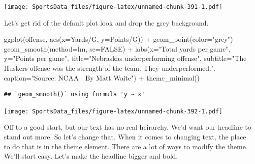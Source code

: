 \documentclass[
]{book}
\newenvironment{Shaded}{\begin{snugshade}}{\end{snugshade}}
\newcommand{\AttributeTok}[1]{\textcolor[rgb]{0.77,0.63,0.00}{#1}}
\newcommand{\ConstantTok}[1]{\textcolor[rgb]{0.00,0.00,0.00}{#1}}
\newcommand{\FunctionTok}[1]{\textcolor[rgb]{0.00,0.00,0.00}{#1}}
\newcommand{\NormalTok}[1]{#1}
\newcommand{\SpecialCharTok}[1]{\textcolor[rgb]{0.00,0.00,0.00}{#1}}
\newcommand{\StringTok}[1]{\textcolor[rgb]{0.31,0.60,0.02}{#1}}
\begin{document}
\texttt{[image: SportsData\_files/figure-latex/unnamed-chunk-391-1.pdf]}

Let's get rid of the default plot look and drop the grey background.

\begin{Shaded}
\begin{Highlighting}[]
\FunctionTok{ggplot}\NormalTok{(offense, }\FunctionTok{aes}\NormalTok{(}\AttributeTok{x=}\StringTok{\textasciigrave{}}\AttributeTok{Yards/G}\StringTok{\textasciigrave{}}\NormalTok{, }\AttributeTok{y=}\StringTok{\textasciigrave{}}\AttributeTok{Points/G}\StringTok{\textasciigrave{}}\NormalTok{)) }\SpecialCharTok{+} 
  \FunctionTok{geom\_point}\NormalTok{(}\AttributeTok{color=}\StringTok{"grey"}\NormalTok{) }\SpecialCharTok{+} \FunctionTok{geom\_smooth}\NormalTok{(}\AttributeTok{method=}\NormalTok{lm, }\AttributeTok{se=}\ConstantTok{FALSE}\NormalTok{) }\SpecialCharTok{+} 
  \FunctionTok{labs}\NormalTok{(}\AttributeTok{x=}\StringTok{"Total yards per game"}\NormalTok{, }\AttributeTok{y=}\StringTok{"Points per game"}\NormalTok{, }\AttributeTok{title=}\StringTok{"Nebraska\textquotesingle{}s underperforming offense"}\NormalTok{, }\AttributeTok{subtitle=}\StringTok{"The Husker\textquotesingle{}s offense was the strength of the team. They underperformed."}\NormalTok{, }\AttributeTok{caption=}\StringTok{"Source: NCAA | By Matt Waite"}\NormalTok{) }\SpecialCharTok{+} 
  \FunctionTok{theme\_minimal}\NormalTok{()}
\end{Highlighting}
\end{Shaded}

\begin{verbatim}
## `geom_smooth()` using formula 'y ~ x'
\end{verbatim}

\texttt{[image: SportsData\_files/figure-latex/unnamed-chunk-392-1.pdf]}

Off to a good start, but our text has no real heirarchy. We'd want our headline to stand out more. So let's change that. When it comes to changing text, the place to do that is in the theme element. \href{http://ggplot2.tidyverse.org/reference/theme.html}{There are a lot of ways to modify the theme}. We'll start easy. Let's make the headline bigger and bold.
\end{document}
